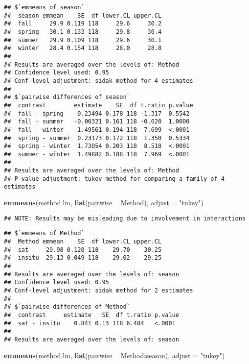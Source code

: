 \documentclass[
]{article}
\newenvironment{Shaded}{\begin{snugshade}}{\end{snugshade}}
\newcommand{\DataTypeTok}[1]{\textcolor[rgb]{0.13,0.29,0.53}{#1}}
\newcommand{\KeywordTok}[1]{\textcolor[rgb]{0.13,0.29,0.53}{\textbf{#1}}}
\newcommand{\NormalTok}[1]{#1}
\newcommand{\OperatorTok}[1]{\textcolor[rgb]{0.81,0.36,0.00}{\textbf{#1}}}
\newcommand{\StringTok}[1]{\textcolor[rgb]{0.31,0.60,0.02}{#1}}
\begin{document}
\begin{verbatim}
## $`emmeans of season`
##  season emmean    SE  df lower.CL upper.CL
##  fall     29.9 0.119 118     29.6     30.2
##  spring   30.1 0.133 118     29.8     30.4
##  summer   29.9 0.109 118     29.6     30.1
##  winter   28.4 0.154 118     28.0     28.8
## 
## Results are averaged over the levels of: Method 
## Confidence level used: 0.95 
## Conf-level adjustment: sidak method for 4 estimates 
## 
## $`pairwise differences of season`
##  contrast        estimate    SE  df t.ratio p.value
##  fall - spring   -0.23494 0.178 118 -1.317  0.5542 
##  fall - summer   -0.00321 0.161 118 -0.020  1.0000 
##  fall - winter    1.49561 0.194 118  7.699  <.0001 
##  spring - summer  0.23173 0.172 118  1.350  0.5334 
##  spring - winter  1.73054 0.203 118  8.518  <.0001 
##  summer - winter  1.49882 0.188 118  7.969  <.0001 
## 
## Results are averaged over the levels of: Method 
## P value adjustment: tukey method for comparing a family of 4 estimates
\end{verbatim}

\begin{Shaded}
\begin{Highlighting}[]
\KeywordTok{emmeans}\NormalTok{(method.lm, }\KeywordTok{list}\NormalTok{(pairwise }\OperatorTok{~}\StringTok{ }\NormalTok{Method), }\DataTypeTok{adjust =} \StringTok{"tukey"}\NormalTok{)}
\end{Highlighting}
\end{Shaded}

\begin{verbatim}
## NOTE: Results may be misleading due to involvement in interactions
\end{verbatim}

\begin{verbatim}
## $`emmeans of Method`
##  Method emmean    SE  df lower.CL upper.CL
##  sat     29.98 0.120 118    29.70    30.25
##  insitu  29.13 0.049 118    29.02    29.25
## 
## Results are averaged over the levels of: season 
## Confidence level used: 0.95 
## Conf-level adjustment: sidak method for 2 estimates 
## 
## $`pairwise differences of Method`
##  contrast     estimate   SE  df t.ratio p.value
##  sat - insitu    0.841 0.13 118 6.484   <.0001 
## 
## Results are averaged over the levels of: season
\end{verbatim}

\begin{Shaded}
\begin{Highlighting}[]
\KeywordTok{emmeans}\NormalTok{(method.lm, }\KeywordTok{list}\NormalTok{(pairwise }\OperatorTok{~}\StringTok{ }\NormalTok{Method}\OperatorTok{:}\NormalTok{season), }\DataTypeTok{adjust =} \StringTok{"tukey"}\NormalTok{)}
\end{Highlighting}
\end{Shaded}
\end{document}
